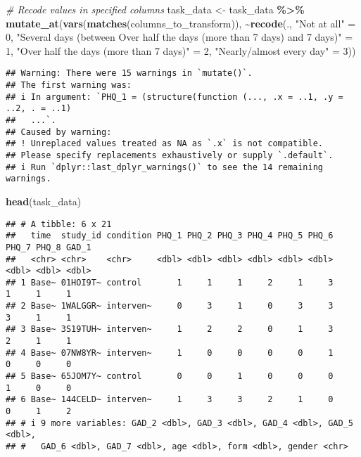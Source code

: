 \documentclass[
]{article}
\newenvironment{Shaded}{\begin{snugshade}}{\end{snugshade}}
\newcommand{\CommentTok}[1]{\textcolor[rgb]{0.56,0.35,0.01}{\textit{#1}}}
\newcommand{\DecValTok}[1]{\textcolor[rgb]{0.00,0.00,0.81}{#1}}
\newcommand{\FunctionTok}[1]{\textcolor[rgb]{0.13,0.29,0.53}{\textbf{#1}}}
\newcommand{\NormalTok}[1]{#1}
\newcommand{\OtherTok}[1]{\textcolor[rgb]{0.56,0.35,0.01}{#1}}
\newcommand{\SpecialCharTok}[1]{\textcolor[rgb]{0.81,0.36,0.00}{\textbf{#1}}}
\newcommand{\StringTok}[1]{\textcolor[rgb]{0.31,0.60,0.02}{#1}}
\begin{document}
\begin{Shaded}
\begin{Highlighting}[]
\CommentTok{\# Recode values in specified columns}
\NormalTok{task\_data }\OtherTok{\textless{}{-}}\NormalTok{ task\_data }\SpecialCharTok{\%\textgreater{}\%}
  \FunctionTok{mutate\_at}\NormalTok{(}\FunctionTok{vars}\NormalTok{(}\FunctionTok{matches}\NormalTok{(columns\_to\_transform)), }\SpecialCharTok{\textasciitilde{}}\FunctionTok{recode}\NormalTok{(., }
                                                         \StringTok{"Not at all"} \OtherTok{=} \DecValTok{0}\NormalTok{,}
                                                         \StringTok{"Several days (between Over half the days (more than 7 days)  and 7 days)"} \OtherTok{=} \DecValTok{1}\NormalTok{,}
                                                         \StringTok{"Over half the days (more than 7 days)"} \OtherTok{=} \DecValTok{2}\NormalTok{,}
                                                         \StringTok{"Nearly/almost every day"} \OtherTok{=} \DecValTok{3}\NormalTok{))}
\end{Highlighting}
\end{Shaded}

\begin{verbatim}
## Warning: There were 15 warnings in `mutate()`.
## The first warning was:
## i In argument: `PHQ_1 = (structure(function (..., .x = ..1, .y = ..2, . = ..1)
##   ...`.
## Caused by warning:
## ! Unreplaced values treated as NA as `.x` is not compatible.
## Please specify replacements exhaustively or supply `.default`.
## i Run `dplyr::last_dplyr_warnings()` to see the 14 remaining warnings.
\end{verbatim}

\begin{Shaded}
\begin{Highlighting}[]
\FunctionTok{head}\NormalTok{(task\_data)}
\end{Highlighting}
\end{Shaded}

\begin{verbatim}
## # A tibble: 6 x 21
##   time  study_id condition PHQ_1 PHQ_2 PHQ_3 PHQ_4 PHQ_5 PHQ_6 PHQ_7 PHQ_8 GAD_1
##   <chr> <chr>    <chr>     <dbl> <dbl> <dbl> <dbl> <dbl> <dbl> <dbl> <dbl> <dbl>
## 1 Base~ 01HOI9T~ control       1     1     1     2     1     3     1     1     1
## 2 Base~ 1WALGGR~ interven~     0     3     1     0     3     3     3     1     1
## 3 Base~ 3S19TUH~ interven~     1     2     2     0     1     3     2     1     1
## 4 Base~ 07NW8YR~ interven~     1     0     0     0     0     1     0     0     0
## 5 Base~ 65JOM7Y~ control       0     0     1     0     0     0     1     0     0
## 6 Base~ 144CELD~ interven~     1     3     3     2     1     0     0     1     2
## # i 9 more variables: GAD_2 <dbl>, GAD_3 <dbl>, GAD_4 <dbl>, GAD_5 <dbl>,
## #   GAD_6 <dbl>, GAD_7 <dbl>, age <dbl>, form <dbl>, gender <chr>
\end{verbatim}
\end{document}
